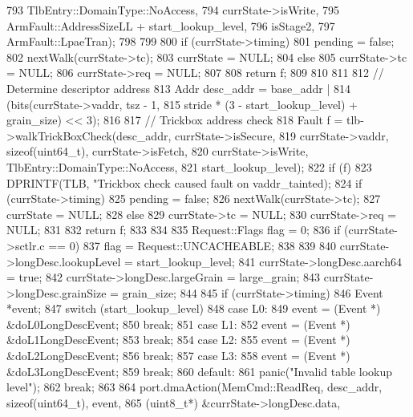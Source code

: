 \begin{DoxyCode}
{{793                                  TlbEntry::DomainType::NoAccess,
794                                  currState->isWrite,
795                                  ArmFault::AddressSizeLL + start_lookup_level,
796                                  isStage2,
797                                  ArmFault::LpaeTran);
798 
799 
800         if (currState->timing) {
801             pending = false;
802             nextWalk(currState->tc);
803             currState = NULL;
804         } else {
805             currState->tc = NULL;
806             currState->req = NULL;
807         }
808         return f;
809 
810    }
811 
812     // Determine descriptor address
813     Addr desc_addr = base_addr |
814         (bits(currState->vaddr, tsz - 1,
815               stride * (3 - start_lookup_level) + grain_size) << 3);
816 
817     // Trickbox address check
818     Fault f = tlb->walkTrickBoxCheck(desc_addr, currState->isSecure,
819                         currState->vaddr, sizeof(uint64_t), currState->isFetch,
820                         currState->isWrite, TlbEntry::DomainType::NoAccess,
821                         start_lookup_level);
822     if (f) {
823         DPRINTF(TLB, "Trickbox check caused fault on %
      vaddr_tainted);
824         if (currState->timing) {
825             pending = false;
826             nextWalk(currState->tc);
827             currState = NULL;
828         } else {
829             currState->tc = NULL;
830             currState->req = NULL;
831         }
832         return f;
833     }
834 
835     Request::Flags flag = 0;
836     if (currState->sctlr.c == 0) {
837         flag = Request::UNCACHEABLE;
838     }
839 
840     currState->longDesc.lookupLevel = start_lookup_level;
841     currState->longDesc.aarch64 = true;
842     currState->longDesc.largeGrain = large_grain;
843     currState->longDesc.grainSize = grain_size;
844 
845     if (currState->timing) {
846         Event *event;
847         switch (start_lookup_level) {
848           case L0:
849             event = (Event *) &doL0LongDescEvent;
850             break;
851           case L1:
852             event = (Event *) &doL1LongDescEvent;
853             break;
854           case L2:
855             event = (Event *) &doL2LongDescEvent;
856             break;
857           case L3:
858             event = (Event *) &doL3LongDescEvent;
859             break;
860           default:
861             panic("Invalid table lookup level");
862             break;
863         }
864         port.dmaAction(MemCmd::ReadReq, desc_addr, sizeof(uint64_t), event,
865                        (uint8_t*) &currState->longDesc.data,
}}
\end{DoxyCode}
